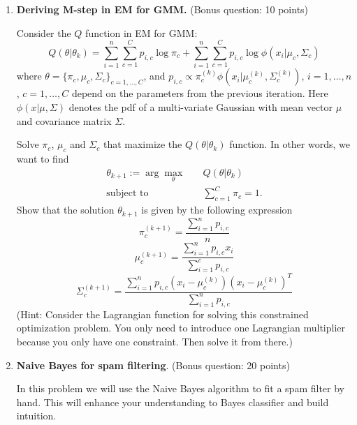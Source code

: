 \documentclass[twoside,10pt]{article}
\begin{document}
\begin{enumerate}
\item {\bf Deriving M-step in EM for GMM.} (Bonus question: 10 points)

Consider the $Q$ function in EM for GMM:
\[
Q(\theta|\theta_k) = \sum_{i=1}^n \sum_{c=1}^C p_{i, c} \log \pi_c
+ \sum_{i=1}^n \sum_{c=1}^C p_{i, c} \log \phi(x_i|\mu_c, \Sigma_c)
\] 
where $\theta= \{\pi_c, \mu_c, \Sigma_c\}_{c=1, \ldots, C}$, and  $p_{i,c} \propto \pi_c^{(k)} \phi(x_i|\mu_c^{(k)}, \Sigma_c^{(k)})$, $i = 1, \ldots, n$, $c = 1, \ldots, C$ depend on the parameters from the previous iteration. Here $\phi(x|\mu, \Sigma)$ denotes the pdf of a multi-variate Gaussian with mean vector $\mu$ and covariance matrix $\Sigma$. 

Solve $\pi_c$, $\mu_c$ and $\Sigma_c$ that maximize the $Q(\theta|\theta_k)$ function.
In other words, we want to find
\begin{equation*}
\begin{split}
\theta_{k+1} := \arg\max_{\theta} &\quad Q(\theta|\theta_k)\\
\mbox{subject to} &\quad \sum_{c = 1}^C \pi_{c} = 1.
\end{split}
\end{equation*}
Show that the solution $\theta_{k+1}$ is given by the following expression
\[
\pi_c^{(k+1)} = \frac{\sum_{i=1}^n p_{i,c}}{n}
\]
\[
\mu_c^{(k+1)}  = \frac{\sum_{i=1}^n p_{i,c} x_i}{\sum_{i=1}^c p_{i,c}}
\]
\[
\Sigma_c^{(k+1)} = \frac{\sum_{i=1}^n p_{i,c} (x_i - \mu_c^{(k)})(x_i - \mu_c^{(k)})^T}{\sum_{i=1}^n p_{i,c}}
\]
(Hint: Consider the Lagrangian function for solving this constrained optimization problem. You only need to introduce one Lagrangian multiplier because you only have one constraint. Then solve it from there.)



\item {\bf Naive Bayes for spam filtering}. (Bonus question: 20 points) 

In this problem we will use the Naive Bayes algorithm to fit a spam filter by hand. This will enhance your understanding to Bayes classifier and build intuition. 


\end{enumerate}
\end{document}
